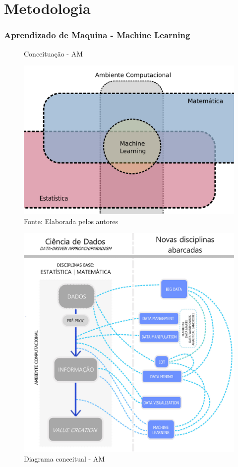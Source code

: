 \documentclass[11pt, aspectratio=169]{beamer}
\begin{document}
\section{Metodologia}

\begin{frame}
  \frametitle{Aprendizado de Maquina - Machine Learning}
  \begin{figure}[ht]
    \begin{minipage}[b]{0.45\linewidth}
      \centering
      \caption{Conceituação - AM}
      \includegraphics[height=.6\paperheight]{../Figures/ML/mat_est_ML.png}
      \\{\footnotesize Fonte: Elaborada pelos autores}
      \label{fig:diag_ml_01}
    \end{minipage}
    \hspace{0.2cm}
    \begin{minipage}[b]{0.45\linewidth}
      \centering
      \caption{Diagrama conceitual - AM}
      \includegraphics[height=.6\paperheight]{../Figures/ML/MAPA_conceitual_ciencia_de_dados_recorte.jpg}

\end{minipage}
\end{figure}
\end{frame}
\end{document}
